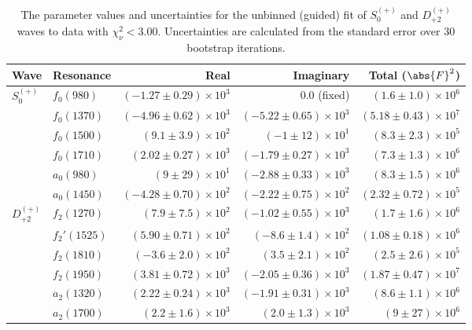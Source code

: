 \begin{table}[h]
    \begin{center}
        \begin{tabular}{llrrr}\toprule
        Wave & Resonance & Real & Imaginary & Total ($\abs{F}^2$) \\\midrule
$S_{0}^{(+)}$ & $f_{0}(980)$ & $(-1.27 \pm 0.29) \times 10^{3}$ & $0.0$ (fixed) & $(1.6 \pm 1.0) \times 10^{6}$ \\
 & $f_{0}(1370)$ & $(-4.96 \pm 0.62) \times 10^{3}$ & $(-5.22 \pm 0.65) \times 10^{3}$ & $(5.18 \pm 0.43) \times 10^{7}$ \\
 & $f_{0}(1500)$ & $(9.1 \pm 3.9) \times 10^{2}$ & $(-1 \pm 12) \times 10^{1}$ & $(8.3 \pm 2.3) \times 10^{5}$ \\
 & $f_{0}(1710)$ & $(2.02 \pm 0.27) \times 10^{3}$ & $(-1.79 \pm 0.27) \times 10^{3}$ & $(7.3 \pm 1.3) \times 10^{6}$ \\
 & $a_{0}(980)$ & $(9 \pm 29) \times 10^{1}$ & $(-2.88 \pm 0.33) \times 10^{3}$ & $(8.3 \pm 1.5) \times 10^{6}$ \\
 & $a_{0}(1450)$ & $(-4.28 \pm 0.70) \times 10^{2}$ & $(-2.22 \pm 0.75) \times 10^{2}$ & $(2.32 \pm 0.72) \times 10^{5}$ \\
$D_{+2}^{(+)}$ & $f_{2}(1270)$ & $(7.9 \pm 7.5) \times 10^{2}$ & $(-1.02 \pm 0.55) \times 10^{3}$ & $(1.7 \pm 1.6) \times 10^{6}$ \\
 & $f_{2}'(1525)$ & $(5.90 \pm 0.71) \times 10^{2}$ & $(-8.6 \pm 1.4) \times 10^{2}$ & $(1.08 \pm 0.18) \times 10^{6}$ \\
 & $f_{2}(1810)$ & $(-3.6 \pm 2.0) \times 10^{2}$ & $(3.5 \pm 2.1) \times 10^{2}$ & $(2.5 \pm 2.6) \times 10^{5}$ \\
 & $f_{2}(1950)$ & $(3.81 \pm 0.72) \times 10^{3}$ & $(-2.05 \pm 0.36) \times 10^{3}$ & $(1.87 \pm 0.47) \times 10^{7}$ \\
 & $a_{2}(1320)$ & $(2.22 \pm 0.24) \times 10^{3}$ & $(-1.91 \pm 0.31) \times 10^{3}$ & $(8.6 \pm 1.1) \times 10^{6}$ \\
 & $a_{2}(1700)$ & $(2.2 \pm 1.6) \times 10^{3}$ & $(2.0 \pm 1.3) \times 10^{3}$ & $(9 \pm 27) \times 10^{6}$ \\\bottomrule
        \end{tabular}
    \caption{The parameter values and uncertainties for the unbinned (guided) fit of $S_{0}^{(+)}$ and $D_{+2}^{(+)}$ waves to data with $\chi^2_\nu < 3.00$. Uncertainties are calculated from the standard error over $30$ bootstrap iterations.}\label{tab:unbinned-fit-chisqdof-3.0-guided-Sp0p-Dp2p}
    \end{center}
\end{table}

